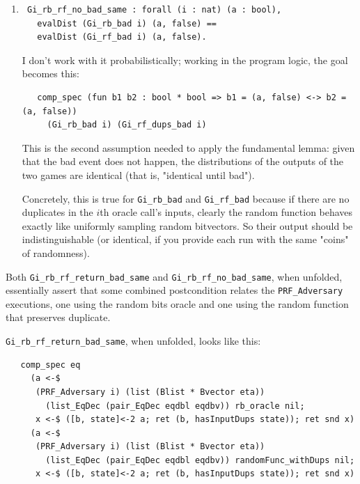 \documentclass[12pt,lot, lof]{puthesis}
\newcommand{\li} {\lstinline}
\begin{document}
{\begin{enumerate}
Concretely, this is true for \li|Gi_rb_bad| and \li|Gi_rf_bad| because the probability of the bad event in both is the probability of duplicates in a list of length $n$ of uniformly-randomly-sampled bit vectors.

\par
\item \begin{lstlisting}
 Gi_rb_rf_no_bad_same : forall (i : nat) (a : bool),
   evalDist (Gi_rb_bad i) (a, false) == 
   evalDist (Gi_rf_bad i) (a, false).
\end{lstlisting}

I don't work with it probabilistically; working in the program logic, the goal becomes this:

\begin{lstlisting}
   comp_spec (fun b1 b2 : bool * bool => b1 = (a, false) <-> b2 = (a, false))
     (Gi_rb_bad i) (Gi_rf_dups_bad i)
\end{lstlisting}     

This is the second assumption needed to apply the fundamental lemma: given that the bad event does not happen, the distributions of the outputs of the two games are identical (that is, "identical until bad").

Concretely, this is true for \li|Gi_rb_bad| and \li|Gi_rf_bad| because if there are no duplicates in the $i$th oracle call's inputs, clearly the random function behaves exactly like uniformly sampling random bitvectors. So their output should be indistinguishable (or identical, if you provide each run with the same "coins" of randomness).

\end{enumerate}



Both \li|Gi_rb_rf_return_bad_same| and \li|Gi_rb_rf_no_bad_same|, when unfolded, essentially assert that some combined postcondition relates the \li|PRF_Adversary| executions, one using the random bits oracle and one using the random function that preserves duplicate.

\li|Gi_rb_rf_return_bad_same|, when unfolded, looks like this:

\begin{lstlisting}
   comp_spec eq
     (a <-$
      (PRF_Adversary i) (list (Blist * Bvector eta))
        (list_EqDec (pair_EqDec eqdbl eqdbv)) rb_oracle nil;
      x <-$ ([b, state]<-2 a; ret (b, hasInputDups state)); ret snd x)
     (a <-$
      (PRF_Adversary i) (list (Blist * Bvector eta))
        (list_EqDec (pair_EqDec eqdbl eqdbv)) randomFunc_withDups nil;
      x <-$ ([b, state]<-2 a; ret (b, hasInputDups state)); ret snd x)
\end{lstlisting}      

}
\end{document}
